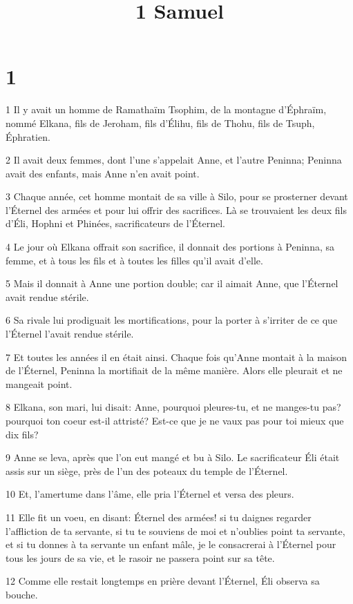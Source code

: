 

\title{1 Samuel}


\chapter{1}

\par 1 Il y avait un homme de Ramathaïm Tsophim, de la montagne d'Éphraïm, nommé Elkana, fils de Jeroham, fils d'Élihu, fils de Thohu, fils de Tsuph, Éphratien.
\par 2 Il avait deux femmes, dont l'une s'appelait Anne, et l'autre Peninna; Peninna avait des enfants, mais Anne n'en avait point.
\par 3 Chaque année, cet homme montait de sa ville à Silo, pour se prosterner devant l'Éternel des armées et pour lui offrir des sacrifices. Là se trouvaient les deux fils d'Éli, Hophni et Phinées, sacrificateurs de l'Éternel.
\par 4 Le jour où Elkana offrait son sacrifice, il donnait des portions à Peninna, sa femme, et à tous les fils et à toutes les filles qu'il avait d'elle.
\par 5 Mais il donnait à Anne une portion double; car il aimait Anne, que l'Éternel avait rendue stérile.
\par 6 Sa rivale lui prodiguait les mortifications, pour la porter à s'irriter de ce que l'Éternel l'avait rendue stérile.
\par 7 Et toutes les années il en était ainsi. Chaque fois qu'Anne montait à la maison de l'Éternel, Peninna la mortifiait de la même manière. Alors elle pleurait et ne mangeait point.
\par 8 Elkana, son mari, lui disait: Anne, pourquoi pleures-tu, et ne manges-tu pas? pourquoi ton coeur est-il attristé? Est-ce que je ne vaux pas pour toi mieux que dix fils?
\par 9 Anne se leva, après que l'on eut mangé et bu à Silo. Le sacrificateur Éli était assis sur un siège, près de l'un des poteaux du temple de l'Éternel.
\par 10 Et, l'amertume dans l'âme, elle pria l'Éternel et versa des pleurs.
\par 11 Elle fit un voeu, en disant: Éternel des armées! si tu daignes regarder l'affliction de ta servante, si tu te souviens de moi et n'oublies point ta servante, et si tu donnes à ta servante un enfant mâle, je le consacrerai à l'Éternel pour tous les jours de sa vie, et le rasoir ne passera point sur sa tête.
\par 12 Comme elle restait longtemps en prière devant l'Éternel, Éli observa sa bouche.
